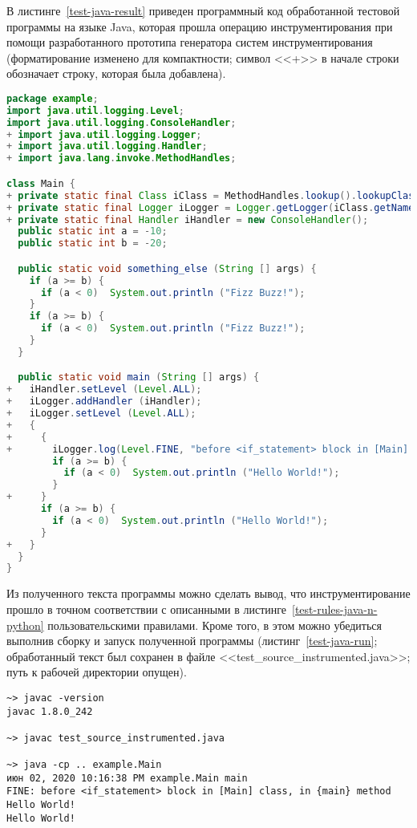 В листинге~\ref{test-java-result} приведен программный код обработанной тестовой программы на языке Java, которая прошла операцию инструментирования при помощи разработанного прототипа генератора систем инструментирования (форматирование изменено для компактности; символ <<+>> в начале строки обозначает строку, которая была добавлена).

\begin{lstlisting}[frame=single, language=Java, label={test-java-result}, caption={Текст инструментированного тестового приложения.}]
package example;
import java.util.logging.Level;
import java.util.logging.ConsoleHandler;
+ import java.util.logging.Logger;
+ import java.util.logging.Handler;
+ import java.lang.invoke.MethodHandles;

class Main {
+ private static final Class iClass = MethodHandles.lookup().lookupClass();
+ private static final Logger iLogger = Logger.getLogger(iClass.getName());
+ private static final Handler iHandler = new ConsoleHandler();
  public static int a = -10;
  public static int b = -20;

  public static void something_else (String [] args) {
    if (a >= b) {
      if (a < 0)  System.out.println ("Fizz Buzz!");
    }
    if (a >= b) {
      if (a < 0)  System.out.println ("Fizz Buzz!");
    }
  }

  public static void main (String [] args) {
+   iHandler.setLevel (Level.ALL);
+   iLogger.addHandler (iHandler);
+   iLogger.setLevel (Level.ALL);
+   {
+     {
+       iLogger.log(Level.FINE, "before <if_statement> block in [Main] class, in {main} method");
        if (a >= b) {
          if (a < 0)  System.out.println ("Hello World!");
        }
+     }
      if (a >= b) {
        if (a < 0)  System.out.println ("Hello World!");
      }
+   }
  }
}
\end{lstlisting}

Из полученного текста программы можно сделать вывод, что инструментирование прошло в точном соответствии с описанными в листинге~\ref{test-rules-java-n-python} пользовательскими правилами.
Кроме того, в этом можно убедиться выполнив сборку и запуск полученной программы (листинг~\ref{test-java-run}; обработанный текст был сохранен в файле <<test\_source\_instrumented.java>>; путь к рабочей директории опущен).

\begin{lstlisting}[frame=single, label={test-java-run}, caption={Результаты сборки и запуска обработанного тестового приложения.}]
~> javac -version
javac 1.8.0_242

~> javac test_source_instrumented.java

~> java -cp .. example.Main
июн 02, 2020 10:16:38 PM example.Main main
FINE: before <if_statement> block in [Main] class, in {main} method
Hello World!
Hello World!
\end{lstlisting}

